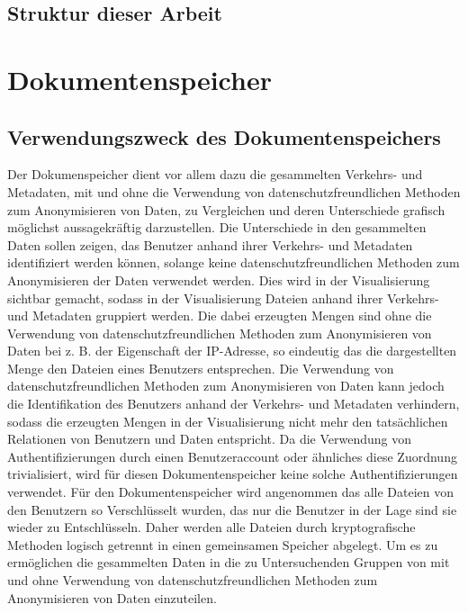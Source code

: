\documentclass[
    fontsize=12pt,
    headings=small,
    parskip=half,           %
    bibliography=totoc,
    numbers=noenddot,       %
    open=any,               %
    ]{scrreprt}
\begin{document}
\section{Struktur dieser Arbeit}


\chapter{Dokumentenspeicher} \label{Kap:Dokumentenspeicher}

    \section{Verwendungszweck des Dokumentenspeichers} 

Der Dokumenspeicher dient vor allem dazu die gesammelten Verkehrs- und Metadaten, mit und ohne die Verwendung von datenschutzfreundlichen Methoden zum Anonymisieren von Daten, zu Vergleichen und deren Unterschiede grafisch möglichst aussagekräftig darzustellen.
Die Unterschiede in den gesammelten Daten sollen zeigen, das Benutzer anhand ihrer Verkehrs- und Metadaten identifiziert werden können, solange keine datenschutzfreundlichen Methoden zum Anonymisieren der Daten verwendet werden.
Dies wird in der Visualisierung sichtbar gemacht, sodass in der Visualisierung Dateien anhand ihrer Verkehrs- und Metadaten gruppiert werden.
Die dabei erzeugten Mengen sind ohne die Verwendung von datenschutzfreundlichen Methoden zum Anonymisieren von Daten bei z. B. der Eigenschaft der IP-Adresse, so eindeutig das die dargestellten Menge den Dateien eines Benutzers entsprechen.
Die Verwendung von datenschutzfreundlichen Methoden zum Anonymisieren von Daten kann jedoch die Identifikation des Benutzers anhand der Verkehrs- und Metadaten verhindern, sodass die erzeugten Mengen in der Visualisierung nicht mehr den tatsächlichen Relationen von Benutzern und Daten entspricht.
Da die Verwendung von Authentifizierungen durch einen Benutzeraccount oder ähnliches diese Zuordnung trivialisiert, wird für diesen Dokumentenspeicher keine solche Authentifizierungen verwendet. 
Für den Dokumentenspeicher wird angenommen das alle Dateien von den Benutzern so Verschlüsselt wurden, das nur die Benutzer in der Lage sind sie wieder zu Entschlüsseln.
Daher werden alle Dateien durch kryptografische Methoden logisch getrennt in einen gemeinsamen Speicher abgelegt.
Um es zu ermöglichen die gesammelten Daten in die zu Untersuchenden Gruppen von mit und ohne Verwendung von datenschutzfreundlichen Methoden zum Anonymisieren von Daten einzuteilen.
\end{document}
